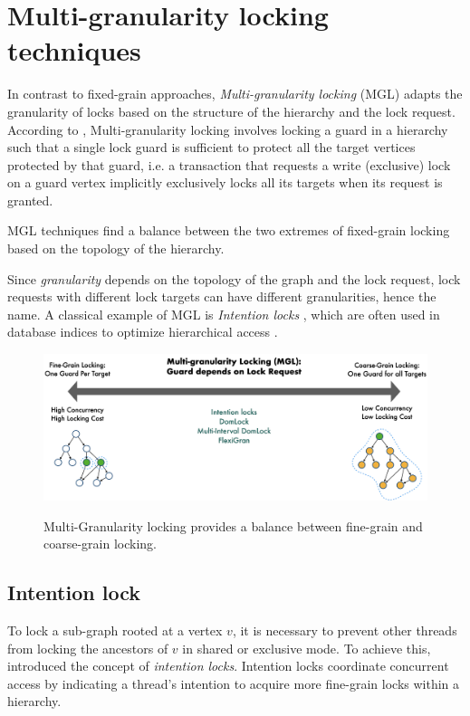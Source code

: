 \section{Multi-granularity locking techniques}

In contrast to fixed-grain approaches, \emph{Multi-granularity locking} (MGL) \cite{gray1975granularity} adapts the granularity of locks based on the structure of the hierarchy and the lock request. 
According to \citet{gray1975granularity}, Multi-granularity locking involves locking a guard in a hierarchy such that a single lock guard is sufficient to protect all the target vertices protected by that guard, i.e. a transaction that requests a write (exclusive) lock on a guard vertex implicitly exclusively locks all its targets when its request is granted. 


 MGL techniques find a balance between the two extremes of fixed-grain locking based on the topology of the hierarchy.
 
Since \emph{granularity} depends on the topology of the graph and the lock request, lock requests with different lock targets can have different granularities, hence the name. A classical example of MGL is \emph{Intention locks} \cite{StonebrakerGranularity}, which are often used in database indices to optimize hierarchical access \cite{sqlintentionlocks}. 

\begin{figure}[h]
    \captionsetup{justification=centering}
    \includegraphics[width=\textwidth]{figures/MGLSpectrum.png}
    \label{fig:mglspectrum}
    \caption{Multi-Granularity locking provides a balance between fine-grain and coarse-grain locking.}
\end{figure}



\subsection{Intention lock}

To lock a sub-graph rooted at a vertex $v$, it is necessary to prevent other threads from locking the ancestors of $v$ in shared or exclusive mode. To achieve this, \citet{gray1975granularity} introduced the concept of \emph{intention locks}. Intention locks coordinate concurrent access by indicating a thread's intention to acquire more fine-grain locks within a hierarchy. 

